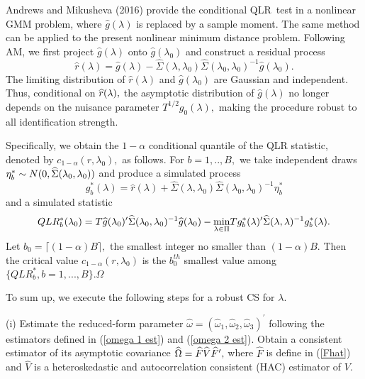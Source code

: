 \documentclass[11pt]{article}
\begin{document}
Andrews and Mikusheva (2016) provide the conditional QLR\ test in a
nonlinear GMM problem, where $\widehat{g}(\lambda )$ is replaced by a sample
moment. The same method can be applied to the present nonlinear minimum
distance problem. Following AM, we first project $\widehat{g}(\lambda )$
onto $\widehat{g}(\lambda _{0})$ and construct a residual process%
\begin{equation}
\widehat{r}(\lambda )=\widehat{g}(\lambda )-\widehat{\Sigma }(\lambda
,\lambda _{0})\widehat{\Sigma }(\lambda _{0},\lambda _{0})^{-1}\widehat{g}%
(\lambda _{0}).  \label{red process}
\end{equation}%
The limiting distribution of $\widehat{r}(\lambda )$ and $\widehat{g}%
(\lambda _{0})$ are Gaussian and independent. Thus, conditional on $\widehat{%
r}(\lambda ),$ the asymptotic distribution of $\widehat{g}(\lambda )$ no
longer depends on the nuisance parameter $T^{1/2}g_{0}(\lambda ),$ making
the procedure robust to all identification strength.

Specifically, we obtain the $1-\alpha $ conditional quantile of the QLR
statistic, denoted by $c_{1-\alpha }(r,\lambda _{0}),$ as follows. For $%
b=1,..,B,$ we take independent draws $\eta _{b}^{\ast }\sim N(0,\widehat{%
\Sigma }(\lambda _{0},\lambda _{0}))$ and produce a simulated process 
\begin{equation}
g_{b}^{\ast }(\lambda )=\widehat{r}(\lambda )+\widehat{\Sigma }(\lambda
,\lambda _{0})\widehat{\Sigma }(\lambda _{0},\lambda _{0})^{-1}\eta
_{b}^{\ast }
\end{equation}%
and a simulated statistic%
\begin{equation}
QLR_{b}^{\ast }(\lambda _{0})=T\widehat{g}(\lambda _{0})^{\prime }\widehat{%
\Sigma }(\lambda _{0},\lambda _{0})^{-1}\widehat{g}(\lambda _{0})-\underset{%
\lambda \in \Pi }{\min }Tg_{b}^{\ast }(\lambda )^{\prime }\widehat{\Sigma }%
(\lambda ,\lambda )^{-1}g_{b}^{\ast }(\lambda ).
\end{equation}%
Let $b_{0}=\lceil (1-\alpha )B\rceil ,$ the smallest integer no smaller than 
$(1-\alpha )B$. Then the critical value $c_{1-\alpha }(r,\lambda _{0})$ is
the $b_{0}^{th}$ smallest value among $\{QLR_{b}^{\ast },b=1,...,B\}.\Omega $

\smallskip 

To sum up, we execute the following steps for a robust CS for $\lambda .$

\noindent (i) Estimate the reduced-form parameter $\widehat{\omega }=(%
\widehat{\omega }_{1},\widehat{\omega }_{2},\widehat{\omega }_{3})^{\prime }$
following the estimators defined in (\ref{omega 1 est}) and (\ref{omega 2
est}). Obtain a consistent estimator of its asymptotic covariance $\widehat{%
\Omega }=\widehat{F}\widehat{V}\widehat{F}^{\prime },$ where $\widehat{F}$
is define in (\ref{Fhat}) and $\widehat{V}$ is a heteroskedastic and
autocorrelation consistent (HAC) estimator of $V.$
\end{document}
